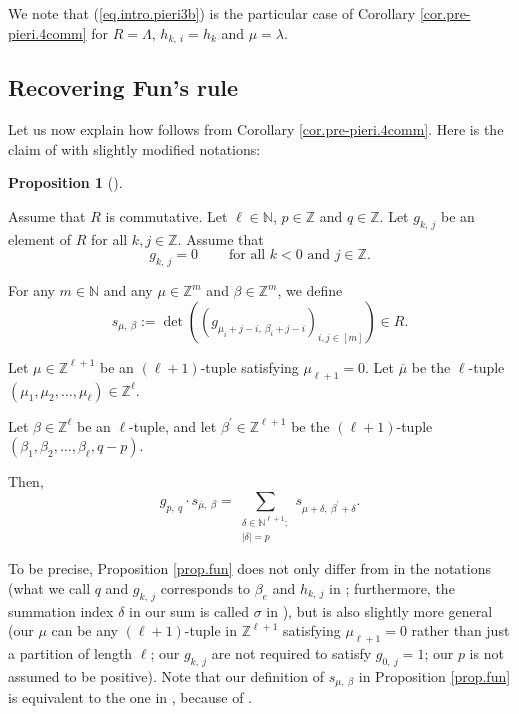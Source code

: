\documentclass
[numbers=enddot,12pt,final,onecolumn,notitlepage,english]{scrartcl}%
\theoremstyle{definition}
\newtheorem{prop}[theo]{Proposition}
\newenvironment{proposition}[1][]
{\begin{prop}[#1]\begin{leftbar}}
{\end{leftbar}\end{prop}}
\let\sumnonlimits\sum
\renewcommand{\sum}{\sumnonlimits\limits}
\begin{document}
We note that (\ref{eq.intro.pieri3b}) is the particular case of Corollary
\ref{cor.pre-pieri.4comm} for $R=\Lambda$, $h_{k,\ i}=h_{k}$ and $\mu=\lambda$.

\subsection{Recovering Fun's rule}

Let us now explain how \cite[Proposition 3.9]{Fun} follows from Corollary
\ref{cor.pre-pieri.4comm}. Here is the claim of \cite[Proposition 3.9]{Fun}
with slightly modified notations:

\begin{proposition}
\label{prop.fun}Assume that $R$ is commutative. Let $\ell\in\mathbb{N}$,
$p\in\mathbb{Z}$ and $q\in\mathbb{Z}$. Let $g_{k,\ j}$ be an element of $R$
for all $k,j\in\mathbb{Z}$. Assume that%
\begin{equation}
g_{k,\ j}=0\ \ \ \ \ \ \ \ \ \ \text{for all }k<0\text{ and }j\in\mathbb{Z}.
\label{eq.prop.fun.ass=0}%
\end{equation}


For any $m\in\mathbb{N}$ and any $\mu\in\mathbb{Z}^{m}$ and $\beta
\in\mathbb{Z}^{m}$, we define%
\[
s_{\mu,\ \beta}:=\det\left(  \left(  g_{\mu_{i}+j-i,\ \beta_{i}+j-i}\right)
_{i,j\in\left[  m\right]  }\right)  \in R.
\]


Let $\mu\in\mathbb{Z}^{\ell+1}$ be an $\left(  \ell+1\right)  $-tuple
satisfying $\mu_{\ell+1}=0$. Let $\overline{\mu}$ be the $\ell$-tuple $\left(
\mu_{1},\mu_{2},\ldots,\mu_{\ell}\right)  \in\mathbb{Z}^{\ell}$.

Let $\beta\in\mathbb{Z}^{\ell}$ be an $\ell$-tuple, and let $\beta^{\prime}%
\in\mathbb{Z}^{\ell+1}$ be the $\left(  \ell+1\right)  $-tuple $\left(
\beta_{1},\beta_{2},\ldots,\beta_{\ell},q-p\right)  $.

Then,%
\[
g_{p,\ q}\cdot s_{\overline{\mu},\ \beta}=\sum_{\substack{\delta\in
\mathbb{N}^{\ell+1};\\\left\vert \delta\right\vert =p}}s_{\mu+\delta
,\ \beta^{\prime}+\delta}.
\]

\end{proposition}

To be precise, Proposition \ref{prop.fun} does not only differ from
\cite[Proposition 3.9]{Fun} in the notations (what we call $q$ and $g_{k,\ j}$
corresponds to $\beta_{e}$ and $h_{k,\ j}$ in \cite[Proposition 3.9]{Fun};
furthermore, the summation index $\delta$ in our sum is called $\sigma$ in
\cite[Proposition 3.9]{Fun}), but is also slightly more general (our $\mu$ can
be any $\left(  \ell+1\right)  $-tuple in $\mathbb{Z}^{\ell+1}$ satisfying
$\mu_{\ell+1}=0$ rather than just a partition of length $\ell$; our
$g_{k,\ j}$ are not required to satisfy $g_{0,\ j}=1$; our $p$ is not assumed
to be positive). Note that our definition of $s_{\mu,\ \beta}$ in Proposition
\ref{prop.fun} is equivalent to the one in \cite{Fun}, because of
\cite[(3.3)]{Fun}.
\end{document}
